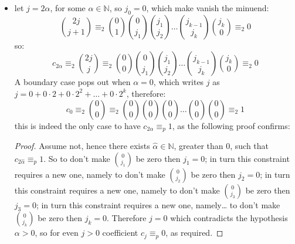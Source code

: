 \documentclass[11pt,a4paper]{article} %
\begin{document}
    \begin{itemize}
        \item let $j=2\alpha$, for some $\alpha\in\mathbb{N}$, so $j_{0}=0$,
            which make vanish the minuend:
            \begin{displaymath}
                {{2j}\choose{j+1}}
                \equiv_{2} {{0}\choose{1}}{{0}\choose{j_{1}}}{{j_{1}}\choose{j_{2}}}
                    \ldots{{j_{k-1}}\choose{j_{k}}}{{j_{k}}\choose{0}}\equiv_{2}0
            \end{displaymath}
            so:
            \begin{displaymath}
                c_{2\alpha}\equiv_{2}{{2j}\choose{j}}
                \equiv_{2} {{0}\choose{0}}{{0}\choose{j_{1}}}{{j_{1}}\choose{j_{2}}}
                    \ldots{{j_{k-1}}\choose{j_{k}}}{{j_{k}}\choose{0}}\equiv_{2}0
            \end{displaymath}
            A boundary case pops out when $\alpha=0$, which writes $j$ as 
            $j=0 + 0\cdot2 + 0\cdot2^{2} + \ldots + 0\cdot2^{k}$, therefore:
            \begin{displaymath}
                c_{0}\equiv_{2}{{0}\choose{0}}
                \equiv_{2} {{0}\choose{0}}{{0}\choose{0}}{{0}\choose{0}}
                    \ldots{{0}\choose{0}}{{0}\choose{0}}\equiv_{2}1
            \end{displaymath}
            this is indeed the only case to have $c_{2\alpha} \equiv_{p}1$,
            as the following proof confirms:
            \begin{proof}
                Assume not, hence there exists $\hat{\alpha}\in\mathbb{N}$, greater than $0$,
                such that $c_{2\hat{\alpha}} \equiv_{p}1$. So to don't make ${{0}\choose{j_{1}}}$
                be zero then $j_{1}=0$; in turn this constraint requires a new one, namely
                to don't make ${{0}\choose{j_{2}}}$ be zero then $j_{2}=0$; 
                in turn this constraint requires a new one, namely
                to don't make ${{0}\choose{j_{3}}}$ be zero then $j_{3}=0$; 
                in turn this constraint requires a new one, namely\ldots
                to don't make ${{0}\choose{j_{k}}}$ be zero then $j_{k}=0$.
                Therefore $j=0$ which contradicts the hypothesis $\alpha>0$, so
                for even $j > 0$ coefficient $c_{j}\equiv_{p}0$, as required.
            \end{proof}


\end{itemize}
\end{document}
